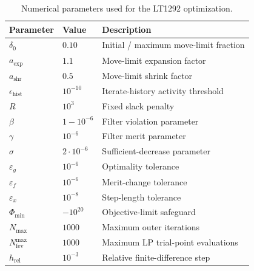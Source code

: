 \begin{table}[h]
\centering
\small
\begin{tabular}{lll}
\toprule
Parameter & Value & Description \\
\midrule
$\delta_0$                         & $0.10$           & Initial / maximum move-limit fraction \\
$a_{\mathrm{exp}}$                 & $1.1$            & Move-limit expansion factor \\
$a_{\mathrm{shr}}$                 & $0.5$            & Move-limit shrink factor \\
$\epsilon_{\mathrm{hist}}$         & $10^{-10}$       & Iterate-history activity threshold \\
$R$                                & $10^{3}$         & Fixed slack penalty \\
$\beta$                            & $1-10^{-6}$      & Filter violation parameter \\
$\gamma$                           & $10^{-6}$        & Filter merit parameter \\
$\sigma$                           & $2\cdot 10^{-6}$ & Sufficient-decrease parameter \\
$\varepsilon_g$                    & $10^{-6}$        & Optimality tolerance \\
$\varepsilon_f$                    & $10^{-6}$        & Merit-change tolerance \\
$\varepsilon_x$                    & $10^{-8}$        & Step-length tolerance \\
$\Phi_{\min}$                      & $-10^{20}$       & Objective-limit safeguard \\
$N_{\max}$                         & $1000$           & Maximum outer iterations \\
$N_{\mathrm{fev}}^{\max}$          & $1000$           & Maximum LP trial-point evaluations \\
$h_{\mathrm{rel}}$                 & $10^{-3}$        & Relative finite-difference step \\
\bottomrule
\end{tabular}
\caption{Numerical parameters used for the LT1292 optimization.}
\label{tab:slp_settings}
\end{table}

